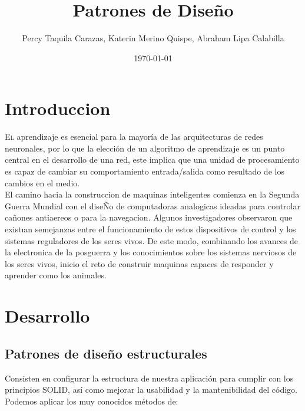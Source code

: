 \documentclass[twoside,twocolumn]{article}
\title{Patrones de Diseño}
\author{Percy Taquila Carazas, Katerin Merino Quispe, Abraham Lipa Calabilla}
\date{\today}
\begin{document}
\maketitle


\section{Introduccion}

\lettrine[nindent=0em,lines=3]{E}l aprendizaje es esencial para la mayoría de las arquitecturas de redes neuronales, por lo que la elección de un algoritmo de aprendizaje es un punto central en el desarrollo de una red, este implica que una unidad de procesamiento es capaz de cambiar su comportamiento entrada/salida
como resultado de los cambios en el medio.\\

El camino hacia la construccion de maquinas inteligentes comienza en la Segunda Guerra Mundial con el diseÑo de computadoras analogicas ideadas para controlar cañones antiaereos o para la navegacion.
Algunos investigadores observaron que existıan semejanzas entre el funcionamiento de estos dispositivos de control y los sistemas reguladores de los seres vivos. De este modo, combinando los avances de la electronica de la posguerra y los conocimientos sobre los sistemas nerviosos de los seres vivos, inicio el reto de construir maquinas capaces de responder y aprender como los animales.






\section{Desarrollo}
\subsection{Patrones de diseño estructurales}

Consisten en configurar la estructura de nuestra aplicación para cumplir con los principios SOLID, así como mejorar la usabilidad y la mantenibilidad del código. Podemos aplicar los muy conocidos métodos de:
\end{document}
